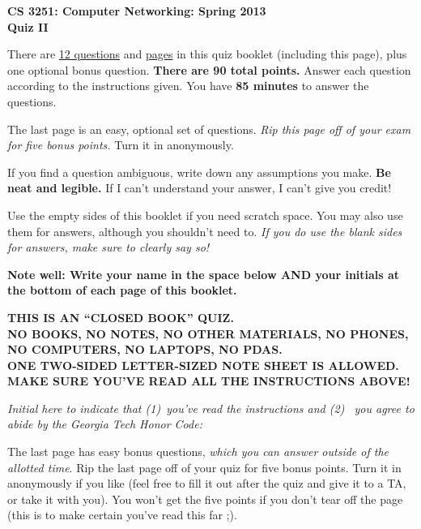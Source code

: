 \documentclass[11pt]{article}
\newcounter{answer}
\begin{document}
\begin{center}
{\Large{\bf CS 3251: Computer Networking: Spring 2013} \\
 \vspace{.15in} \Huge{\bf Quiz II}} 
\vspace{.2in}

\begin{boxedminipage}[h]{6in}
There are \underline{12 questions} and \underline{\pageref{lastpage}
  pages} in this quiz booklet (including this page), plus one optional
bonus question. {\bf There are 90 total points.}  Answer each question according to the instructions
given.  You have {\bf 85 minutes} to answer the questions.

\vspace{.1in} The last page is an easy, optional set of questions.  {\em
  Rip this page off of your exam for five bonus points.}  Turn it in
anonymously.


\vspace{.1in} 
If you find a question ambiguous, write down any
assumptions you make.  {\bf Be neat and legible.}  If I can't
understand your answer, I can't give you credit!  

\vspace{.1in} 
Use the empty sides of this booklet if you need scratch space.  You
may also use them for answers, although you shouldn't need to.  {\em If you
do use the blank sides for answers, make sure to clearly say so!}

\vspace{.1in} 
{\bf Note well: Write your name in the space below AND your initials at the bottom of each
page of this booklet.}

\begin{center}{\bf THIS IS AN ``CLOSED BOOK'' QUIZ.\\
NO BOOKS, NO NOTES, NO OTHER MATERIALS, NO PHONES, NO COMPUTERS, NO
LAPTOPS, NO PDAS.\\ 
ONE TWO-SIDED LETTER-SIZED NOTE SHEET IS ALLOWED.
MAKE SURE YOU'VE READ ALL THE INSTRUCTIONS ABOVE!}
\end{center}
{\em Initial here to indicate that (1)~you've read the instructions and (2)~
you agree to abide by the Georgia Tech Honor Code: }



\vspace{.05in} The last page has easy bonus questions, {\em which you can
answer outside of the allotted time}.  Rip the last page off of your
quiz for five bonus points.  Turn it in anonymously if you like (feel
free to fill it out after the quiz and give it to a TA, or take it with you).  You
won't get the five points if you don't tear off the page (this is to
make certain you've read this far ;).
\fi 

\end{boxedminipage}
\end{center}
\end{document}
